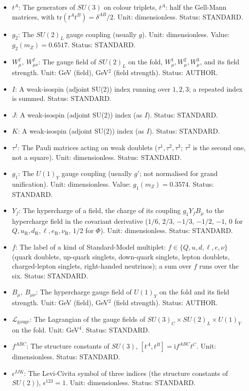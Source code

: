 \documentclass[
  10pt,
]{article}
\begin{document}
\begin{itemize}
\item
  \(t^A\): The generators of \(SU(3)\) on colour triplets, \(t^A\): half
  the Gell-Mann matrices, with \(\mathrm{tr}(t^At^B) = \delta^{AB}/2\).
  Unit: dimensionless. Status: STANDARD.
\item
  \(g_2\): The \(SU(2)_L\) gauge coupling (usually \(g\)). Unit:
  dimensionless. Value: \(g_2(m_Z) = 0.6517\). Status: STANDARD.
\item
  \(W^I_\mu,\ W^I_{\mu\nu}\): The gauge field of \(SU(2)_L\) on the
  fold, \(W^1_\mu, W^2_\mu, W^3_\mu\), and its field strength. Unit: GeV
  (field), GeV\(^2\) (field strength). Status: AUTHOR.
\item
  \(I\): A weak-isospin (adjoint SU(2)) index running over \(1, 2, 3\);
  a repeated index is summed. Status: STANDARD.
\item
  \(J\): A weak-isospin (adjoint SU(2)) index (as \(I\)). Status:
  STANDARD.
\item
  \(K\): A weak-isospin (adjoint SU(2)) index (as \(I\)). Status:
  STANDARD.
\item
  \(\tau^I\): The Pauli matrices acting on weak doublets
  (\(\tau^1, \tau^2, \tau^3\); \(\tau^2\) is the second one, not a
  square). Unit: dimensionless. Status: STANDARD.
\item
  \(g_1\): The \(U(1)_Y\) gauge coupling (usually \(g'\); not normalised
  for grand unification). Unit: dimensionless. Value:
  \(g_1(m_Z) = 0.3574\). Status: STANDARD.
\item
  \(Y_f\): The hypercharge of a field, the charge of its coupling
  \(g_1Y_fB_\mu\) to the hypercharge field in the covariant derivative
  (\(1/6\), \(2/3\), \(-1/3\), \(-1/2\), \(-1\), \(0\) for
  \(Q, u_{\mathrm{R}}, d_{\mathrm{R}}, \ell, e_{\mathrm{R}}, \nu_{\mathrm{R}}\),
  \(1/2\) for \(\Phi\)). Unit: dimensionless. Status: STANDARD.
\item
  \(f\): The label of a kind of Standard-Model multiplet:
  \(f \in \{Q, u, d, \ell, e, \nu\}\) (quark doublets, up-quark
  singlets, down-quark singlets, lepton doublets, charged-lepton
  singlets, right-handed neutrinos); a sum over \(f\) runs over the six.
  Status: STANDARD.
\item
  \(B_\mu,\ B_{\mu\nu}\): The hypercharge gauge field of \(U(1)_Y\) on
  the fold and its field strength. Unit: GeV (field), GeV\(^2\) (field
  strength). Status: AUTHOR.
\item
  \(\mathcal{L}_{\mathrm{gauge}}\): The Lagrangian of the gauge fields
  of \(SU(3)_C\times SU(2)_L\times U(1)_Y\) on the fold. Unit:
  GeV\(^4\). Status: STANDARD.
\item
  \(f^{ABC}\): The structure constants of \(SU(3)\),
  \([t^A, t^B] = \mathrm{i}f^{ABC}t^C\). Unit: dimensionless. Status:
  STANDARD.
\item
  \(\epsilon^{IJK}\): The Levi-Civita symbol of three indices (the
  structure constants of \(SU(2)\)), \(\epsilon^{123} = 1\). Unit:
  dimensionless. Status: STANDARD.
\end{itemize}
\end{document}
